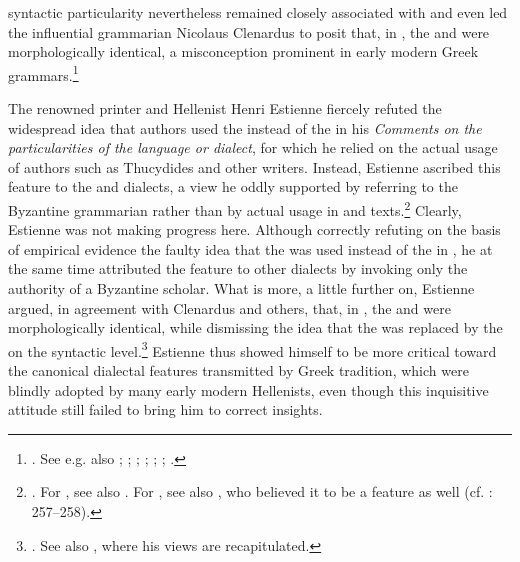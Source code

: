 syntactic particularity nevertheless remained closely associated with  and even led the influential grammarian Nicolaus Clenardus to posit that, in , the  and  were morphologically identical, a misconception prominent in early modern Greek grammars.\footnote{\citet[7 (misprint for 6)]{Clenardus1530}. See e.g. also \citet[534]{Crusius1558}; \citet[12\textsc{\textsuperscript{r}}]{Baile1588}; \citet[11, 37]{Walper1589}; \citet[32, 34]{Gretser1593}; \citet[53, 453]{Lancelot1655}; \citet[101]{Giraudeau1739}; \citet[20]{Facius1782}.}

The renowned printer and Hellenist Henri Estienne fiercely refuted the widespread idea that  authors used the  instead of the  in his \textit{Comments on the particularities of the  language or dialect}, for which he relied on the actual usage of  authors such as Thucydides and other writers. Instead, Estienne ascribed this feature to the  and  dialects, a view he oddly supported by referring to the Byzantine grammarian  rather than by actual usage in  and  texts.\footnote{\citet[15]{Estienne1573}. For , see also \citet[{\scriptsize{)(}}.4\textsc{\textsuperscript{v}}]{Schmidt1604}. For , see also \citet[71]{Merigon1621}, who believed it to be a  feature as well (cf. \citealt{Maittaire1706}: 257–258).} Clearly, Estienne was not making progress here. Although correctly refuting on the basis of empirical evidence the faulty idea that the  was used instead of the  in , he at the same time attributed the feature to other dialects by invoking only the authority of a Byzantine scholar. What is more, a little further on, Estienne argued, in agreement with Clenardus and others, that, in , the  and  were morphologically identical, while dismissing the idea that the  was replaced by the  on the syntactic level.\footnote{\citet[17]{Estienne1573}. See also \citet[29, 42–43, 150]{Estienne1573}, where his views are recapitulated.} Estienne thus showed himself to be more critical toward the canonical dialectal features transmitted by Greek tradition, which were blindly adopted by many early modern Hellenists, even though this inquisitive attitude still failed to bring him to correct insights.

